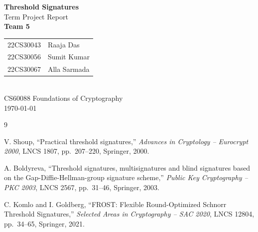 \documentclass[12pt, a4paper]{article}
\begin{document}
\begin{titlepage}
    \centering
    \vspace*{3cm}
    {\LARGE \textbf{Threshold Signatures}}\\[0.8cm]
    {\large Term Project Report}\\[2cm]
    {\large \textbf{Team 5}}\\[0.5cm]
    \begin{tabular}{ll}
    22CS30043 & Raaja Das \\
22CS30056 & Sumit Kumar \\
22CS30067 & Alla Sarmada \\
    \end{tabular}\\[2cm]
    {\large CS60088 Foundations of Cryptography}\\[0.3cm]
    {\large \today}
    \vfill
\end{titlepage}



\tableofcontents
\newpage



\newpage


\newpage


\newpage


\newpage
\begin{thebibliography}{9}

V. Shoup, ``Practical threshold signatures,''
\emph{Advances in Cryptology -- Eurocrypt 2000}, LNCS 1807, pp.\ 207--220, Springer, 2000.

A. Boldyreva, ``Threshold signatures, multisignatures and blind signatures based on the
Gap-Diffie-Hellman-group signature scheme,''
\emph{Public Key Cryptography -- PKC 2003}, LNCS 2567, pp.\ 31--46, Springer, 2003.

C. Komlo and I. Goldberg, ``FROST: Flexible Round-Optimized Schnorr Threshold Signatures,''
\emph{Selected Areas in Cryptography -- SAC 2020}, LNCS 12804, pp.\ 34--65, Springer, 2021.

\end{thebibliography}
\end{document}
